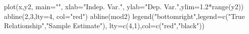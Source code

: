 \begin{Schunk}
\begin{Sinput}
 plot(x,y2, main="", xlab="Indep. Var.", ylab="Dep. Var.",ylim=1.2*range(y2))
 abline(2,3,lty=4, col="red")
 abline(mod2)
 legend("bottomright",legend=c("True Relationship","Sample Estimate"), lty=c(4,1),col=c("red","black"))
\end{Sinput}
\end{Schunk}

